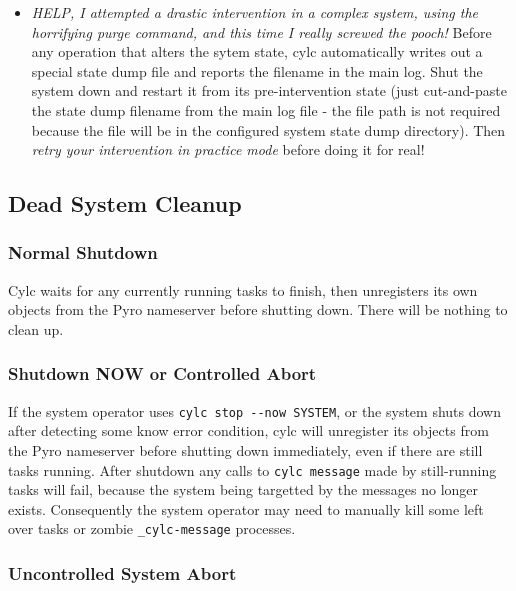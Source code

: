 \documentclass[11pt,a4paper]{article}
\begin{document}
\begin{itemize}
    \item {\em HELP, I attempted a drastic intervention in a complex
        system, using the horrifying purge command, and this time I
        really screwed the pooch!} Before any operation that alters the
        sytem state, cylc automatically writes out a special state dump
        file and reports the filename in the main log. Shut the system
        down and restart it from its pre-intervention state (just
        cut-and-paste the state dump filename from the main log file -
        the file path is not required because the file will be in the
        configured system state dump directory).  Then {\em retry your
        intervention in practice mode} before doing it for real!

\end{itemize}

\subsection{Dead System Cleanup}
\label{DeadSystemCleanup}

\subsubsection{Normal Shutdown}

Cylc waits for any currently running tasks to finish, then
unregisters its own objects from the Pyro nameserver before shutting
down. There will be nothing to clean up. 

\subsubsection{Shutdown NOW or Controlled Abort}

If the system operator uses \lstinline=cylc stop --now SYSTEM=, or the
system shuts down after detecting some know error condition, cylc will
unregister its objects from the Pyro nameserver before shutting down
immediately, even if there are still tasks running. After shutdown any
calls to \lstinline=cylc message= made by still-running tasks will
fail, because the system being targetted by the messages no longer
exists.  Consequently the system operator may need to manually kill some
left over tasks or zombie \lstinline=_cylc-message= processes. 

\subsubsection{Uncontrolled System Abort}
\end{document}

